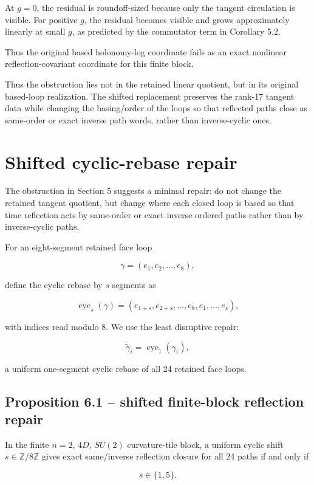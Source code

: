 \documentclass[10pt]{article}
\begin{document}
At \(g=0\), the residual is roundoff-sized because only the tangent circulation is visible.  For positive \(g\), the residual becomes visible and grows approximately linearly at small \(g\), as predicted by the commutator term in Corollary 5.2.

Thus the original based holonomy-log coordinate fails as an exact nonlinear reflection-covariant coordinate for this finite block.

Thus the obstruction lies not in the retained linear quotient, but in its original based-loop realization.  The shifted replacement preserves the rank-17 tangent data while changing the basing/order of the loops so that reflected paths close as same-order or exact inverse path words, rather than inverse-cyclic ones.

\section{Shifted cyclic-rebase repair}

The obstruction in Section 5 suggests a minimal repair: do not change the retained tangent quotient, but change where each closed loop is based so that time reflection acts by same-order or exact inverse ordered paths rather than by inverse-cyclic paths.

For an eight-segment retained face loop

\[
\gamma=(e_1,e_2,\ldots,e_8),
\]

define the cyclic rebase by \(s\) segments as

\[
\operatorname{cyc}_s(\gamma)
=
(e_{1+s},e_{2+s},\ldots,e_8,e_1,\ldots,e_s),
\]

with indices read modulo \(8\).  We use the least disruptive repair:

\[
\widetilde\gamma_i=\operatorname{cyc}_1(\gamma_i),
\]

a uniform one-segment cyclic rebase of all 24 retained face loops.

\subsection{Proposition 6.1 -- shifted finite-block reflection repair}

In the finite \(n=2\), \(4D\), \(SU(2)\) curvature-tile block, a uniform cyclic shift \(s\in\mathbb Z/8\mathbb Z\) gives exact same/inverse reflection closure for all 24 paths if and only if

\[
s\in\{1,5\}.
\]
\end{document}
